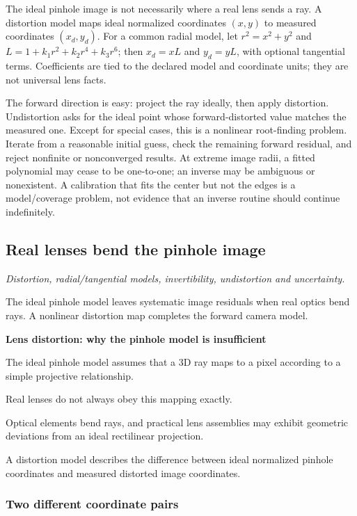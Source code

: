 The ideal pinhole image is not necessarily where a real lens sends a ray. A distortion model maps ideal normalized coordinates \((x,y)\) to measured coordinates \((x_d,y_d)\). For a common radial model, let \(r^2=x^2+y^2\) and \(L=1+k_1r^2+k_2r^4+k_3r^6\); then \(x_d=xL\) and \(y_d=yL\), with optional tangential terms. Coefficients are tied to the declared model and coordinate units; they are not universal lens facts.

The forward direction is easy: project the ray ideally, then apply distortion. Undistortion asks for the ideal point whose forward-distorted value matches the measured one. Except for special cases, this is a nonlinear root-finding problem. Iterate from a reasonable initial guess, check the remaining forward residual, and reject nonfinite or nonconverged results. At extreme image radii, a fitted polynomial may cease to be one-to-one; an inverse may be ambiguous or nonexistent. A calibration that fits the center but not the edges is a model/coverage problem, not evidence that an inverse routine should continue indefinitely.

\subsection{Real lenses bend the pinhole image}\label{real-lenses-bend-the-pinhole-image}

\emph{Distortion, radial/tangential models, invertibility, undistortion and uncertainty.}

The ideal pinhole model leaves systematic image residuals when real optics bend rays. A nonlinear distortion map completes the forward camera model.

\textbf{Lens distortion: why the pinhole model is insufficient}

The ideal pinhole model assumes that a 3D ray maps to a pixel according to a simple projective relationship.

Real lenses do not always obey this mapping exactly.

Optical elements bend rays, and practical lens assemblies may exhibit geometric deviations from an ideal rectilinear projection.

A distortion model describes the difference between ideal normalized pinhole coordinates and measured distorted image coordinates.

\subsubsection{Two different coordinate pairs}\label{two-different-coordinate-pairs}

